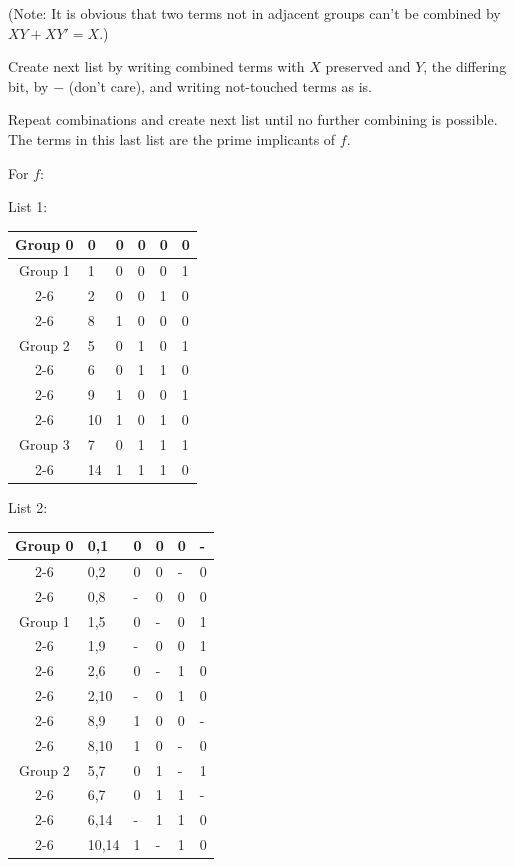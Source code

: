 \documentclass[a4paper,12pt]{article}
\begin{document}
\begin{itemize}
\begin{itemize}
\begin{itemize}
\begin{itemize}
\begin{itemize}
\begin{itemize}
\begin{itemize}
\begin{itemize}
\begin{itemize}
(Note: It is obvious that two terms not in adjacent groups can't be combined by $XY+XY'=X$.)

Create next list by writing combined terms with $X$ preserved and $Y$, the differing bit, by $-$ (don't care), and writing not-touched terms as is.

Repeat combinations and create next list until no further combining is possible. The terms in this last list are the prime implicants of $f$.

For $f$:

List 1:
\begin{longtable}[c]{|c|m|mmmm|}
\hline
Group 0 & 0 & 0 & 0 & 0 & 0 \\\hline
Group 1 & 1 & 0 & 0 & 0 & 1 \\\cline{2-6}
& 2 & 0 & 0 & 1 & 0 \\\cline{2-6}
& 8 & 1 & 0 & 0 & 0 \\\hline
Group 2 & 5 & 0 & 1 & 0 & 1 \\\cline{2-6}
& 6 & 0 & 1 & 1 & 0 \\\cline{2-6}
& 9 & 1 & 0 & 0 & 1 \\\cline{2-6}
& 10 & 1 & 0 & 1 & 0 \\\hline
Group 3 & 7 & 0 & 1 & 1 & 1 \\\cline{2-6}
& 14 & 1 & 1 & 1 & 0 \\\hline
\end{longtable}

List 2:
\begin{longtable}[c]{|c|m|mmmm|}
\hline
Group 0 & 0,1 & 0 & 0 & 0 & - \\\cline{2-6}
& 0,2 & 0 & 0 & - & 0 \\\cline{2-6}
& 0,8 & - & 0 & 0 & 0 \\\hline
Group 1 & 1,5 & 0 & - & 0 & 1 \\\cline{2-6}
& 1,9 & - & 0 & 0 & 1 \\\cline{2-6}
& 2,6 & 0 & - & 1 & 0 \\\cline{2-6}
& 2,10 & - & 0 & 1 & 0 \\\cline{2-6}
& 8,9 & 1 & 0 & 0 & - \\\cline{2-6}
& 8,10 & 1 & 0 & - & 0 \\\hline
Group 2 & 5,7 & 0 & 1 & - & 1 \\\cline{2-6}
& 6,7 & 0 & 1 & 1 & - \\\cline{2-6}
& 6,14 & - & 1 & 1 & 0 \\\cline{2-6}
& 10,14 & 1 & - & 1 & 0 \\\hline
\end{longtable}


\end{itemize}
\end{itemize}
\end{itemize}
\end{itemize}
\end{itemize}
\end{itemize}
\end{itemize}
\end{itemize}
\end{itemize}
\end{document}
